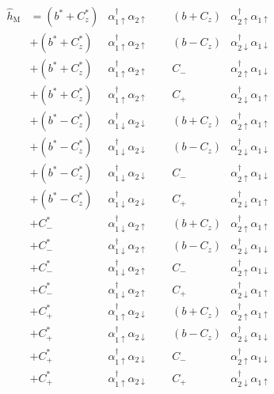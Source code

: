 \documentclass[a4paper, 12pt]{article}
\begin{document}
\begin{equation}
  \begin{aligned}
    \widehat{h}_{\text{M}} 
    &= (b^*+C^*_z)&\alpha_{1\uparrow}^{\dagger}\alpha_{2\uparrow}&\;\;\;\;\;(b+C_z)&\alpha_{2\uparrow}^{\dagger}\alpha_{1\uparrow} \\
    &+ (b^*+C^*_z)&\alpha_{1\uparrow}^{\dagger}\alpha_{2\uparrow}&\;\;\;\;\;(b-C_z)&\alpha_{2\downarrow}^{\dagger}\alpha_{1\downarrow}\\ 
    &+ (b^*+C^*_z)&\alpha_{1\uparrow}^{\dagger}\alpha_{2\uparrow}&\;\;\;\;\;C_{-}&\alpha_{2\uparrow}^{\dagger}\alpha_{1\downarrow} \\
    &+ (b^*+C^*_z)&\alpha_{1\uparrow}^{\dagger}\alpha_{2\uparrow}&\;\;\;\;\;C_{+}&\alpha_{2\downarrow}^{\dagger}\alpha_{1\uparrow}\\
    &+ (b^*-C^*_z)&\alpha_{1\downarrow}^{\dagger}\alpha_{2\downarrow}&\;\;\;\;\;(b+C_z)&\alpha_{2\uparrow}^{\dagger}\alpha_{1\uparrow} \\
    &+ (b^*-C^*_z)&\alpha_{1\downarrow}^{\dagger}\alpha_{2\downarrow}&\;\;\;\;\;(b-C_z)&\alpha_{2\downarrow}^{\dagger}\alpha_{1\downarrow}\\ 
    &+ (b^*-C^*_z)&\alpha_{1\downarrow}^{\dagger}\alpha_{2\downarrow}&\;\;\;\;\;C_{-}&\alpha_{2\uparrow}^{\dagger}\alpha_{1\downarrow} \\
    &+ (b^*-C^*_z)&\alpha_{1\downarrow}^{\dagger}\alpha_{2\downarrow}&\;\;\;\;\;C_{+}&\alpha_{2\downarrow}^{\dagger}\alpha_{1\uparrow}\\
    &+ C^*_{-}&\alpha_{1\downarrow}^{\dagger}\alpha_{2\uparrow}&\;\;\;\;\;(b+C_z)&\alpha_{2\uparrow}^{\dagger}\alpha_{1\uparrow} \\
    &+ C^*_{-}&\alpha_{1\downarrow}^{\dagger}\alpha_{2\uparrow}&\;\;\;\;\;(b-C_z)&\alpha_{2\downarrow}^{\dagger}\alpha_{1\downarrow}\\ 
    &+ C^*_{-}&\alpha_{1\downarrow}^{\dagger}\alpha_{2\uparrow}&\;\;\;\;\;C_{-}&\alpha_{2\uparrow}^{\dagger}\alpha_{1\downarrow} \\
    &+ C^*_{-}&\alpha_{1\downarrow}^{\dagger}\alpha_{2\uparrow}&\;\;\;\;\;C_{+}&\alpha_{2\downarrow}^{\dagger}\alpha_{1\uparrow}\\
    &+ C^*_{+}&\alpha_{1\uparrow}^{\dagger}\alpha_{2\downarrow}&\;\;\;\;\;(b+C_z)&\alpha_{2\uparrow}^{\dagger}\alpha_{1\uparrow} \\
    &+ C^*_{+}&\alpha_{1\uparrow}^{\dagger}\alpha_{2\downarrow}&\;\;\;\;\;(b-C_z)&\alpha_{2\downarrow}^{\dagger}\alpha_{1\downarrow}\\ 
    &+ C^*_{+}&\alpha_{1\uparrow}^{\dagger}\alpha_{2\downarrow}&\;\;\;\;\;C_{-}&\alpha_{2\uparrow}^{\dagger}\alpha_{1\downarrow} \\
    &+ C^*_{+}&\alpha_{1\uparrow}^{\dagger}\alpha_{2\downarrow}&\;\;\;\;\;C_{+}&\alpha_{2\downarrow}^{\dagger}\alpha_{1\uparrow}\\
  \end{aligned}
\end{equation}
\end{document}
